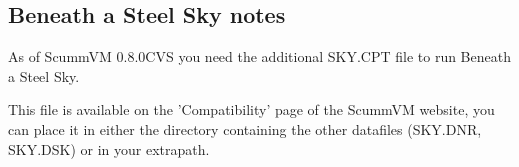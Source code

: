 \subsection{Beneath a Steel Sky notes}
As of ScummVM 0.8.0CVS you need the additional SKY.CPT file to run Beneath a 
Steel Sky.

This file is available on the 'Compatibility' page of the ScummVM
website, you can place it in either the directory containing the other
datafiles (SKY.DNR, SKY.DSK) or in your extrapath.
